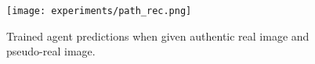 
\begin{figure}[h]
  \begin{center}
	    \texttt{[image: experiments/path\_rec.png]}
	  \end{center}
  \caption{Trained agent predictions when given authentic real image and pseudo-real image.}
  \label{fig:path_rec}
\end{figure}



